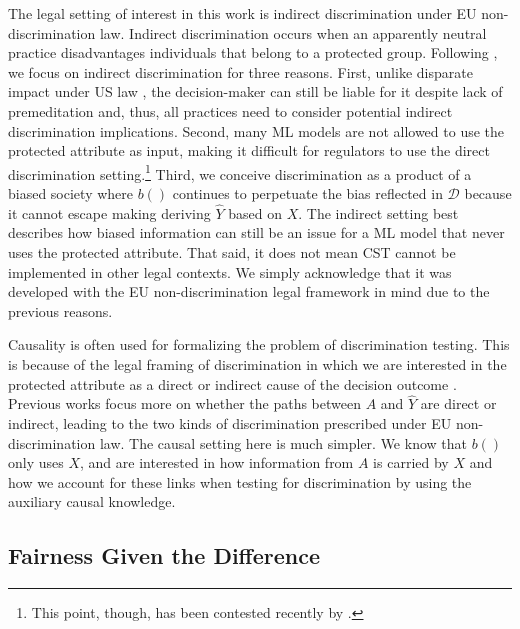 The legal setting of interest in this work is indirect discrimination under EU non-discrimination law. 
Indirect discrimination occurs when an apparently neutral practice disadvantages individuals that belong to a protected group. Following \textcite{Hacker2018TeachingFairness}, we focus on indirect discrimination for three reasons. 
First, unlike disparate impact under US law \parencite{Barocas2016_BigDataImpact}, the decision-maker can still be liable for it despite lack of premeditation and, thus, all practices need to consider potential indirect discrimination implications. 
Second, many ML models are not allowed to use the protected attribute as input, making it difficult for regulators to use the direct discrimination setting.\footnote{This point, though, has been contested recently by \textcite{Adams2022DirectlyDiscriminatoryAl}.}
Third, we conceive discrimination as a product of a biased society where $b()$ continues to perpetuate the bias reflected in $\mathcal{D}$ because it cannot escape making deriving $\hat{Y}$ based on $X$.
The indirect setting best describes how biased information can still be an issue for a ML model that never uses the protected attribute.
%
That said, it does not mean CST cannot be implemented in other legal contexts. 
We simply acknowledge that it was developed with the EU non-discrimination legal framework in mind due to the previous reasons.

Causality is often used for formalizing the problem of discrimination testing.
This is because of the legal framing of discrimination in which we are interested in the protected attribute as a direct or indirect cause of the decision outcome \parencite{Heckman1998_DetectingDiscrimination, Kohler2018CausalEddie}.
Previous works \parencite{Kilbertus2017AvoidDiscCau, Chiappa2019_PathCF, Plecko2022_CFA, Tschantz2022_ProxyDisc} focus more on whether the paths between $A$ and $\hat{Y}$ are direct or indirect, leading to the two kinds of discrimination prescribed under EU non-discrimination law. 
The causal setting here is much simpler. 
We know that $b()$ only uses $X$, and are interested in how information from $A$ is carried by $X$ and how we account for these links when testing for discrimination by using the auxiliary causal knowledge. 

\subsection{Fairness Given the Difference}
\label{sec:CausalKnowledge.KHC}

